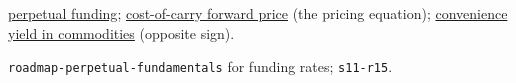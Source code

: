 \begin{qfevidence}
 \hyperref[mech:perpetual-funding]{perpetual funding}; \hyperref[res:cost-of-carry-forward-price]{cost-of-carry forward price} (the pricing equation); \hyperref[def:contango-backwardation-stocks]{convenience yield in commodities} (opposite sign).

 \nolinkurl{roadmap-perpetual-fundamentals} for funding rates; \nolinkurl{s11-r15}.

\end{qfevidence}
